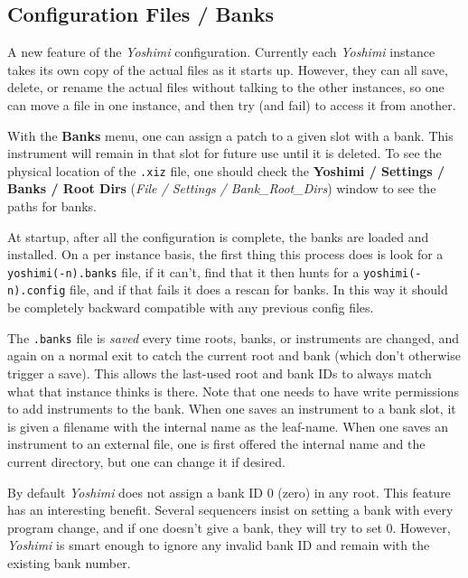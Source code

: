 \subsection{Configuration Files / Banks}
\label{subsec:configuration_banks}

   A new feature of the \textsl{Yoshimi} configuration.  Currently each
   \textsl{Yoshimi} instance takes its own copy of the actual files as it starts
   up.  However, they can all save, delete, or rename the actual files without
   talking to the other instances, so one can move a file in one instance, and
   then try (and fail) to access it from another.

   With the \textbf{Banks} menu, one can assign a patch to a given slot with
   a bank.  This instrument will remain in that slot for future use until it is
   deleted. To see the physical location of the \texttt{.xiz} file, one
   should check the
   \textbf{Yoshimi / Settings / Banks / Root Dirs}
   (\textsl{File / Settings / Bank\_Root\_Dirs}) window to see the paths for
   banks.

   At startup, after all the configuration is complete, the banks are loaded and
   installed.  On a per instance basis, the first thing this process does is
   look for a \texttt{yoshimi(-n).banks} file, if it can't, find that it then
   hunts for a \texttt{yoshimi(-n).config} file, and if that fails it does a
   rescan for banks. In this way it should be completely backward compatible
   with any previous config files.

   The \texttt{.banks} file is \textsl{saved} every time roots, banks, or
   instruments are changed, and again on a normal exit to catch the current
   root and bank (which don't otherwise trigger a save).  This allows the
   last-used root and bank IDs to always match what that instance thinks is
   there.  Note that one needs to have write permissions to add instruments to
   the bank.  When one saves an instrument to a bank slot, it is given a
   filename with the internal name as the leaf-name.  When one saves an
   instrument to an external file, one is  first offered the internal name
   and the current directory, but one can change it if desired.

   By default \textsl{Yoshimi} does not assign a bank ID 0 (zero) in any root.
   This feature has an interesting benefit. Several sequencers insist on
   setting a bank with every program change, and if one doesn't give a bank,
   they will try to set 0. However, \textsl{Yoshimi} is smart enough to ignore
   any invalid bank ID and remain with the existing bank number.

